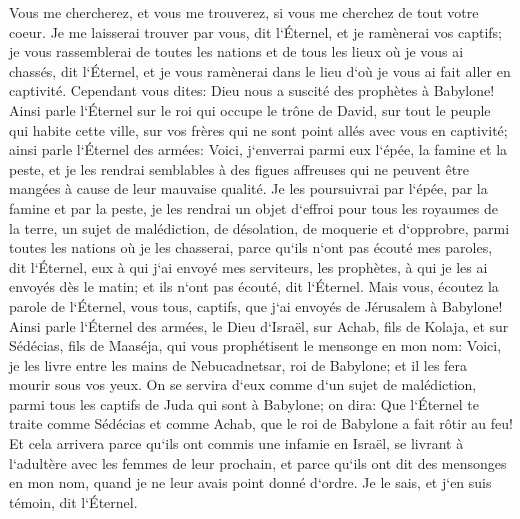\verse Vous me chercherez, et vous me trouverez, si vous me cherchez de tout votre coeur. 
\verse Je me laisserai trouver par vous, dit l`Éternel, et je ramènerai vos captifs; je vous rassemblerai de toutes les nations et de tous les lieux où je vous ai chassés, dit l`Éternel, et je vous ramènerai dans le lieu d`où je vous ai fait aller en captivité. 
\verse Cependant vous dites: Dieu nous a suscité des prophètes à Babylone! 
\verse Ainsi parle l`Éternel sur le roi qui occupe le trône de David, sur tout le peuple qui habite cette ville, sur vos frères qui ne sont point allés avec vous en captivité; 
\verse ainsi parle l`Éternel des armées: Voici, j`enverrai parmi eux l`épée, la famine et la peste, et je les rendrai semblables à des figues affreuses qui ne peuvent être mangées à cause de leur mauvaise qualité. 
\verse Je les poursuivrai par l`épée, par la famine et par la peste, je les rendrai un objet d`effroi pour tous les royaumes de la terre, un sujet de malédiction, de désolation, de moquerie et d`opprobre, parmi toutes les nations où je les chasserai, 
\verse parce qu`ils n`ont pas écouté mes paroles, dit l`Éternel, eux à qui j`ai envoyé mes serviteurs, les prophètes, à qui je les ai envoyés dès le matin; et ils n`ont pas écouté, dit l`Éternel. 
\verse Mais vous, écoutez la parole de l`Éternel, vous tous, captifs, que j`ai envoyés de Jérusalem à Babylone! 
\verse Ainsi parle l`Éternel des armées, le Dieu d`Israël, sur Achab, fils de Kolaja, et sur Sédécias, fils de Maaséja, qui vous prophétisent le mensonge en mon nom: Voici, je les livre entre les mains de Nebucadnetsar, roi de Babylone; et il les fera mourir sous vos yeux. 
\verse On se servira d`eux comme d`un sujet de malédiction, parmi tous les captifs de Juda qui sont à Babylone; on dira: Que l`Éternel te traite comme Sédécias et comme Achab, que le roi de Babylone a fait rôtir au feu! 
\verse Et cela arrivera parce qu`ils ont commis une infamie en Israël, se livrant à l`adultère avec les femmes de leur prochain, et parce qu`ils ont dit des mensonges en mon nom, quand je ne leur avais point donné d`ordre. Je le sais, et j`en suis témoin, dit l`Éternel. 
